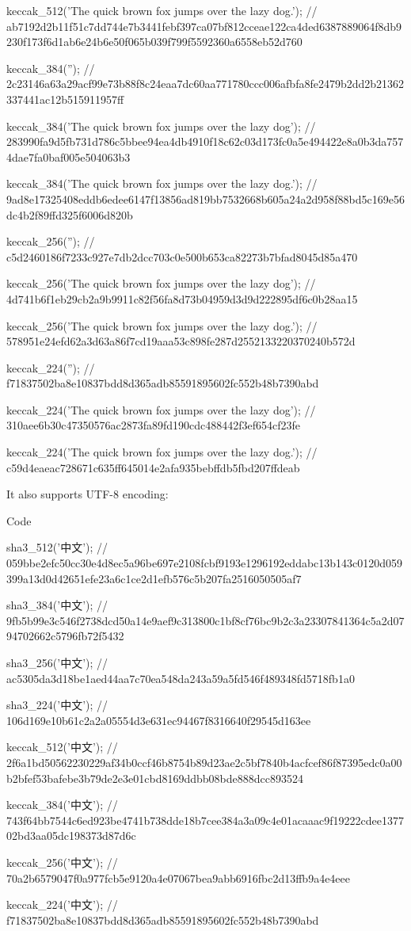 \begin{DoxyCode}
keccak\_512('The quick brown fox jumps over the lazy dog.');
//
       ab7192d2b11f51c7dd744e7b3441febf397ca07bf812cceae122ca4ded6387889064f8db9230f173f6d1ab6e24b6e50f065b039f799f5592360a6558eb52d760

keccak\_384('');
// 2c23146a63a29acf99e73b88f8c24eaa7dc60aa771780ccc006afbfa8fe2479b2dd2b21362337441ac12b515911957ff

keccak\_384('The quick brown fox jumps over the lazy dog');
// 283990fa9d5fb731d786c5bbee94ea4db4910f18c62c03d173fc0a5e494422e8a0b3da7574dae7fa0baf005e504063b3

keccak\_384('The quick brown fox jumps over the lazy dog.');
// 9ad8e17325408eddb6edee6147f13856ad819bb7532668b605a24a2d958f88bd5c169e56dc4b2f89ffd325f6006d820b

keccak\_256('');
// c5d2460186f7233c927e7db2dcc703c0e500b653ca82273b7bfad8045d85a470

keccak\_256('The quick brown fox jumps over the lazy dog');
// 4d741b6f1eb29cb2a9b9911c82f56fa8d73b04959d3d9d222895df6c0b28aa15

keccak\_256('The quick brown fox jumps over the lazy dog.');
// 578951e24efd62a3d63a86f7cd19aaa53c898fe287d2552133220370240b572d

keccak\_224('');
// f71837502ba8e10837bdd8d365adb85591895602fc552b48b7390abd

keccak\_224('The quick brown fox jumps over the lazy dog');
// 310aee6b30c47350576ac2873fa89fd190cdc488442f3ef654cf23fe

keccak\_224('The quick brown fox jumps over the lazy dog.');
// c59d4eaeac728671c635ff645014e2afa935bebffdb5fbd207ffdeab
\end{DoxyCode}
 It also supports U\+T\+F-\/8 encoding\+:

Code 
\begin{DoxyCode}
sha3\_512('中文');
//
       059bbe2efc50cc30e4d8ec5a96be697e2108fcbf9193e1296192eddabc13b143c0120d059399a13d0d42651efe23a6c1ce2d1efb576c5b207fa2516050505af7

sha3\_384('中文');
// 9fb5b99e3c546f2738dcd50a14e9aef9c313800c1bf8cf76bc9b2c3a23307841364c5a2d0794702662c5796fb72f5432

sha3\_256('中文');
// ac5305da3d18be1aed44aa7c70ea548da243a59a5fd546f489348fd5718fb1a0

sha3\_224('中文');
// 106d169e10b61c2a2a05554d3e631ec94467f8316640f29545d163ee

keccak\_512('中文');
//
       2f6a1bd50562230229af34b0ccf46b8754b89d23ae2c5bf7840b4acfcef86f87395edc0a00b2bfef53bafebe3b79de2e3e01cbd8169ddbb08bde888dcc893524

keccak\_384('中文');
// 743f64bb7544c6ed923be4741b738dde18b7cee384a3a09c4e01acaaac9f19222cdee137702bd3aa05dc198373d87d6c

keccak\_256('中文');
// 70a2b6579047f0a977fcb5e9120a4e07067bea9abb6916fbc2d13ffb9a4e4eee

keccak\_224('中文');
// f71837502ba8e10837bdd8d365adb85591895602fc552b48b7390abd
\end{DoxyCode}


